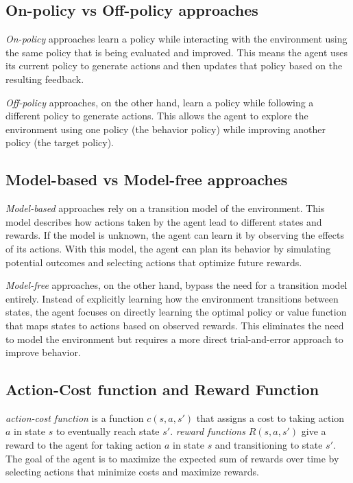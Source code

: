 \subsection{On-policy vs Off-policy approaches}

\emph{On-\gls{policy}} approaches learn a \gls{policy} while interacting with the environment using the same \gls{policy} that is being evaluated and improved. This means the \gls{agent} uses its current \gls{policy} to generate actions and then updates that \gls{policy} based on the resulting feedback. 

\emph{Off-\gls{policy}} approaches, on the other hand, learn a \gls{policy} while following a different \gls{policy} to generate actions. This allows the \gls{agent} to explore the environment using one \gls{policy} (the behavior \gls{policy}) while improving another \gls{policy} (the target \gls{policy}).

\subsection{Model-based vs Model-free approaches}

\emph{Model-based} approaches rely on a \gls{transition model} of the environment. This model describes how actions taken by the \gls{agent} lead to different states and rewards. If the model is unknown, the \gls{agent} can learn it by observing the effects of its actions. With this model, the \gls{agent} can plan its behavior by simulating potential outcomes and selecting actions that optimize future rewards.

\emph{Model-free} approaches, on the other hand, bypass the need for a \gls{transition model} entirely. Instead of explicitly learning how the environment transitions between states, the \gls{agent} focuses on directly learning the optimal \gls{policy} or value function that maps states to actions based on observed rewards. This eliminates the need to model the environment but requires a more direct trial-and-error approach to improve behavior.

\subsection{Action-Cost function and Reward Function}

\emph{\gls{action-cost function}} is a function $c(s, a, s')$ that assigns a cost to taking action $a$ in state $s$ to eventually reach state $s'$.
\emph{\gls{reward function}s} $R(s, a, s')$ give a reward to the \gls{agent} for taking action $a$ in state $s$ and transitioning to state $s'$. The goal of the \gls{agent} is to maximize the expected sum of rewards over time by selecting actions that minimize costs and maximize rewards.

